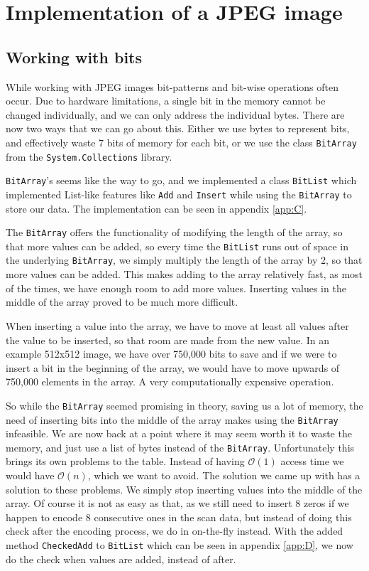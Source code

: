 \section{Implementation of a JPEG image}

\subsection{Working with bits}
While working with JPEG images bit-patterns and bit-wise operations often occur. Due to hardware limitations, a single bit in the memory cannot be changed individually, and we can only address the individual bytes. There are now two ways that we can go about this. Either we use bytes to represent bits, and effectively waste 7 bits of memory for each bit, or we use the class \lstinline|BitArray| from the \lstinline|System.Collections| library.

\lstinline|BitArray|'s seems like the way to go, and we implemented a class \lstinline|BitList| which implemented List-like features like \lstinline|Add| and \lstinline|Insert| while using the \lstinline|BitArray| to store our data. The implementation can be seen in appendix \ref{app:C}. 

The \lstinline|BitArray| offers the functionality of modifying the length of the array, so that more values can be added, so every time the \lstinline|BitList| runs out of space in the underlying \lstinline|BitArray|, we simply multiply the length of the array by 2, so that more values can be added. This makes adding to the array relatively fast, as most of the times, we have enough room to add more values. Inserting values in the middle of the array proved to be much more difficult.

When inserting a value into the array, we have to move at least all values after the value to be inserted, so that room are made from the new value. In an example 512x512 image, we have over 750,000 bits to save and if we were to insert a bit in the beginning of the array, we would have to move upwards of 750,000 elements in the array. A very computationally expensive operation.

So while the \lstinline|BitArray| seemed promising in theory, saving us a lot of memory, the need of inserting bits into the middle of the array makes using the \lstinline|BitArray| infeasible. We are now back at a point where it may seem worth it to waste the memory, and just use a list of bytes instead of the \lstinline|BitArray|. Unfortunately this brings its own problems to the table. Instead of having $\mathcal{O}(1)$ access time we would have $\mathcal{O}(n)$, which we want to avoid. The solution we came up with has a solution to these problems. We simply stop inserting values into the middle of the array. Of course it is not as easy as that, as we still need to insert 8 zeros if we happen to encode 8 consecutive ones in the scan data, but instead of doing this check after the encoding process, we do in on-the-fly instead. With the added method \lstinline|CheckedAdd| to \lstinline|BitList| which can be seen in appendix \ref{app:D}, we now do the check when values are added, instead of after. 